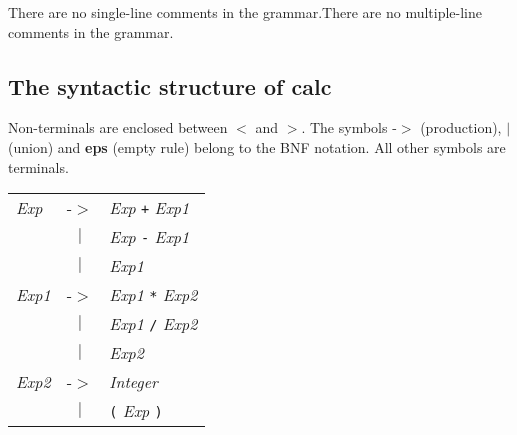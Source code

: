 \documentclass{article}
\begin{document}
There are no single-line comments in the grammar.There are no multiple-line comments in the grammar.

\hypertarget{toc5}{}
\subsection*{The syntactic structure of calc}

Non-terminals are enclosed between $<$ and $>$. 
The symbols -$>$ (production),  \textbf{$|$}  (union) 
and \textbf{eps} (empty rule) belong to the BNF notation. 
All other symbols are terminals.

\begin{center}\begin{tabular}{lll}
\textit{Exp} & -$>$ & \textit{Exp} \texttt{+} \textit{Exp1} \\
 & \multicolumn{1}{c}{\textbf{$|$}} & \textit{Exp} \texttt{-} \textit{Exp1} \\
 & \multicolumn{1}{c}{\textbf{$|$}} & \textit{Exp1} \\
\textit{Exp1} & -$>$ & \textit{Exp1} \texttt{*} \textit{Exp2} \\
 & \multicolumn{1}{c}{\textbf{$|$}} & \textit{Exp1} \texttt{/} \textit{Exp2} \\
 & \multicolumn{1}{c}{\textbf{$|$}} & \textit{Exp2} \\
\textit{Exp2} & -$>$ & \textit{Integer} \\
 & \multicolumn{1}{c}{\textbf{$|$}} & \texttt{(} \textit{Exp} \texttt{)} \\
\end{tabular}\end{center}

\end{document}
